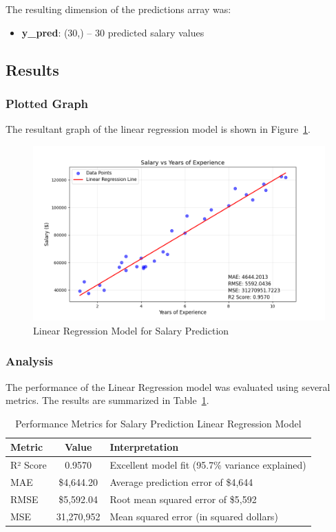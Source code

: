 \noindent The resulting dimension of the predictions array was:
\begin{itemize}
    \item \textbf{y\_pred}: (30,) -- 30 predicted salary values
\end{itemize}

\subsection{Results}
\subsubsection{Plotted Graph}
The resultant graph of the linear regression model is shown in Figure~\ref{fig:salary_regression}.

\begin{figure}[htbp]
    \centering
    \includegraphics[width=\textwidth]{images/salary_analysis_plot.png}
\caption{Linear Regression Model for Salary Prediction}\label{fig:salary_regression}
\end{figure}

\newpage
\subsubsection{Analysis}
The performance of the Linear Regression model was evaluated using several metrics.
The results are summarized in Table~\ref{tab:salary_results}.

\begin{table}[htbp]
    \centering
    \begin{tabular}{ || l || c || l || }
        \hline
        \textbf{Metric} & \textbf{Value} & \textbf{Interpretation} \\
        \hline\hline
        R² Score & 0.9570 & Excellent model fit (95.7\% variance explained) \\
        \hline
        MAE & \$4,644.20 & Average prediction error of \$4,644 \\
        \hline
        RMSE & \$5,592.04 & Root mean squared error of \$5,592 \\
        \hline
        MSE & 31,270,952 & Mean squared error (in squared dollars) \\
        \hline
    \end{tabular}
    \caption{Performance Metrics for Salary Prediction Linear Regression Model}\label{tab:salary_results}
\end{table}


